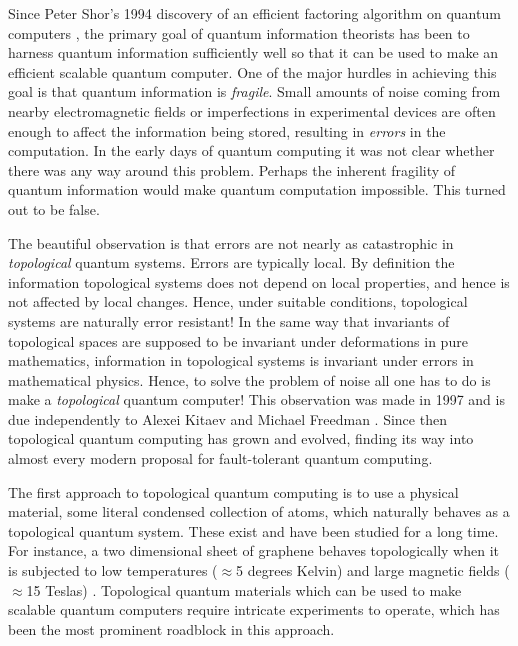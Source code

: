 Since Peter Shor’s 1994 discovery of an efficient factoring algorithm on quantum computers \cite{shor1994algorithms}, the primary goal of quantum information theorists has been to harness quantum information sufficiently well so that it can be used to make an efficient scalable quantum computer. One of the major hurdles in achieving this goal is that quantum information is \textit{fragile}. Small amounts of noise coming from nearby electromagnetic fields or imperfections in experimental devices are often enough to affect the information being stored, resulting in \textit{errors} in the computation. In the early days of quantum computing it was not clear whether there was any way around this problem. Perhaps the inherent fragility of quantum information would make quantum computation impossible. This turned out to be false.

The beautiful observation is that errors are not nearly as catastrophic in \textit{topological} quantum systems. Errors are typically local. By definition the information topological systems does not depend on local properties, and hence is not affected by local changes. Hence, under suitable conditions, topological systems are naturally error resistant! In the same way that invariants of topological spaces are supposed to be invariant under deformations in pure mathematics, information in topological systems is invariant under errors in mathematical physics. Hence, to solve the problem of noise all one has to do is make a \textit{topological} quantum computer! This observation was made in 1997 and is due independently to Alexei Kitaev and Michael Freedman \cite{kitaev2003fault, freedman1998p}. Since then topological quantum computing has grown and evolved, finding its way into almost every modern proposal for fault-tolerant quantum computing.

The first approach to topological quantum computing is to use a physical material, some literal condensed collection of atoms, which naturally behaves as a topological quantum system. These exist and have been studied for a long time. For instance, a two dimensional sheet of graphene behaves topologically when it is subjected to low temperatures ($\approx$5 degrees Kelvin) and large magnetic fields ($\approx$15 Teslas) \cite{bolotin2009observation}. Topological quantum materials which can be used to make scalable quantum computers require intricate experiments to operate, which has been the most prominent roadblock in this approach.

